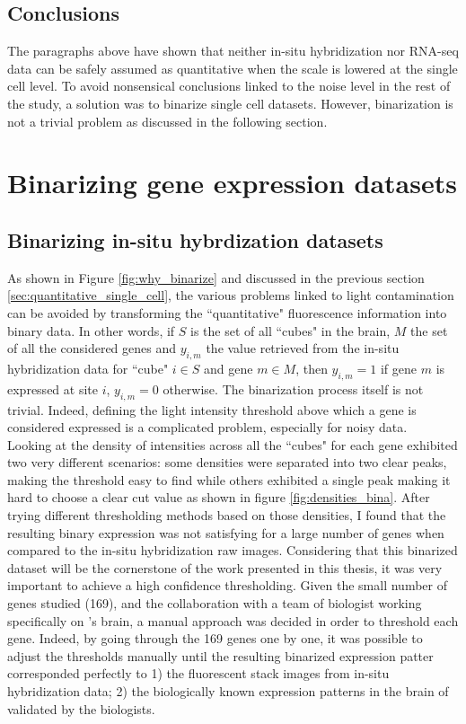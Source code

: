 	\subsection{Conclusions}
	The paragraphs above have shown that neither in-situ hybridization nor RNA-seq data can be safely assumed as quantitative when the scale is lowered at the single cell level. To avoid nonsensical conclusions linked to the noise level in the rest of the study, a solution was to binarize single cell datasets. However, binarization is not a trivial problem as discussed in the following section.



\section{Binarizing gene expression datasets}\label{sec:binarizing}
  \subsection{Binarizing in-situ hybrdization datasets}
	As shown in Figure \ref{fig:why_binarize} and discussed in the previous section \ref{sec:quantitative_single_cell}, the various problems linked to light contamination can be avoided by transforming the ``quantitative" fluorescence information into binary data. In other words, if $S$ is the set of all ``cubes" in the brain, $M$ the set of all the considered genes and $y_{i,m}$ the value retrieved from the in-situ hybridization data for ``cube" $i \in S$ and gene $m \in M$, then  $y_{i,m} = 1$ if gene $m$ is expressed at site $i$, $y_{i,m} = 0$ otherwise. The binarization process itself is not trivial. Indeed, defining the light intensity threshold above which a gene is considered expressed is a complicated problem, especially for noisy data.\\

	Looking at the density of intensities across all the ``cubes" for each gene exhibited two very different scenarios: some densities were separated into two clear peaks, making the threshold easy to find while others exhibited a single peak making it hard to choose a clear cut value as shown in figure \ref{fig:densities_bina}. After trying different thresholding methods based on those densities, I found that the resulting binary expression was not satisfying for a large number of genes when compared to the in-situ hybridization raw images. Considering that this binarized dataset will be the cornerstone of the work presented in this thesis, it was very important to achieve a high confidence thresholding. Given the small number of genes studied (169), and the collaboration with a team of biologist working specifically on \platyfull{}'s brain, a manual approach was decided in order to threshold each gene. Indeed, by going through the 169 genes one by one, it was possible to adjust the thresholds manually until the resulting binarized expression patter corresponded perfectly to 1) the fluorescent stack images from in-situ hybridization data; 2) the biologically known expression patterns in the brain of \platy{} validated by the biologists.\\
	
